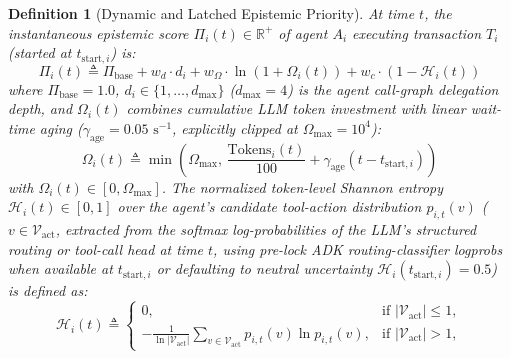 \documentclass[conference,10pt]{IEEEtran}
\newtheorem{definition}{Definition}
\begin{document}
\begin{definition}[Dynamic and Latched Epistemic Priority]
At time $t$, the instantaneous epistemic score $\Pi_i(t) \in \mathbb{R}^+$ of agent $A_i$ executing transaction $T_i$ (started at $t_{\text{start},i}$) is:
\begin{equation}
\Pi_i(t) \triangleq \Pi_{\text{base}} + w_d \cdot d_i + w_\Omega \cdot \ln(1 + \Omega_i(t)) + w_c \cdot (1 - \mathcal{H}_i(t))
\end{equation}
where $\Pi_{\text{base}} = 1.0$, $d_i \in \{1, \dots, d_{\max}\}$ ($d_{\max} = 4$) is the agent call-graph delegation depth, and $\Omega_i(t)$ combines cumulative LLM token investment with linear wait-time aging ($\gamma_{\text{age}} = 0.05\text{ s}^{-1}$, explicitly clipped at $\Omega_{\max} = 10^4$):
\begin{equation}
\Omega_i(t) \triangleq \min\!\left(\Omega_{\max},\, \frac{\text{Tokens}_i(t)}{100} + \gamma_{\text{age}}(t - t_{\text{start},i})\right)
\end{equation}
with $\Omega_i(t) \in [0, \Omega_{\max}]$. The normalized token-level Shannon entropy $\mathcal{H}_i(t) \in [0, 1]$ over the agent's candidate tool-action distribution $p_{i,t}(v)$ ($v \in \mathcal{V}_{\text{act}}$, extracted from the softmax log-probabilities of the LLM's structured routing or tool-call head at time $t$, using pre-lock ADK routing-classifier logprobs when available at $t_{\text{start},i}$ or defaulting to neutral uncertainty $\mathcal{H}_i(t_{\text{start},i}) = 0.5$) is defined as:
\begin{equation}
\mathcal{H}_i(t) \triangleq \begin{cases}
0, & \text{if } |\mathcal{V}_{\text{act}}| \le 1, \\
-\frac{1}{\ln |\mathcal{V}_{\text{act}}|}\sum_{v \in \mathcal{V}_{\text{act}}} p_{i,t}(v)\ln p_{i,t}(v), & \text{if } |\mathcal{V}_{\text{act}}| > 1,
\end{cases}
\end{equation}

\end{definition}
\end{document}
